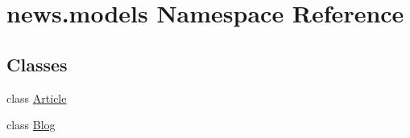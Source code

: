 \hypertarget{namespacenews_1_1models}{}\section{news.\+models Namespace Reference}
\label{namespacenews_1_1models}
\subsection*{Classes}
\begin{DoxyCompactItemize}
\item 
class \mbox{\hyperlink{classnews_1_1models_1_1_article}{Article}}
\item 
class \mbox{\hyperlink{classnews_1_1models_1_1_blog}{Blog}}
\end{DoxyCompactItemize}
